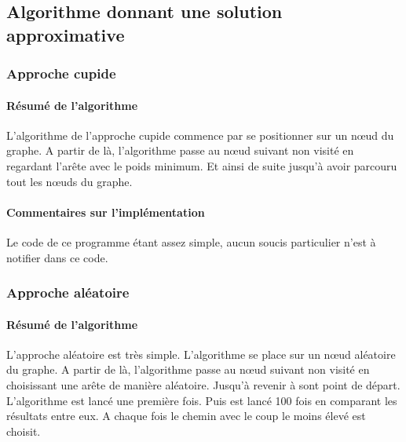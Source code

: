 \documentclass[10pt,a4paper]{report}
\begin{document}
		
	\subsection{Algorithme donnant une solution approximative}
	
		\subsubsection{Approche cupide}
		
		\paragraph{Résumé de l'algorithme\\}
		\begin{flushleft}
		L'algorithme de l'approche cupide commence par se positionner sur un nœud du graphe. A partir de là, l'algorithme passe au nœud suivant non visité en regardant l'arête avec le poids minimum. Et ainsi de suite jusqu'à avoir parcouru tout les nœuds du graphe.
		\end{flushleft}
		
		
		\paragraph{Commentaires sur l'implémentation\\}
		\begin{flushleft}
		Le code de ce programme étant assez simple, aucun soucis particulier n'est à notifier dans ce code.
		\end{flushleft}
		
		\subsubsection{Approche aléatoire}
		
		\paragraph{Résumé de l'algorithme\\}
		\begin{flushleft}
		L'approche aléatoire est très simple. L'algorithme se place sur un nœud aléatoire du graphe. A partir de là, l'algorithme passe au nœud suivant non visité en choisissant une arête de manière aléatoire. Jusqu'à revenir à sont point de départ.
		L'algorithme est lancé une première fois. Puis est lancé 100 fois en comparant les résultats entre eux. A chaque fois le chemin avec le coup le moins élevé est choisit.
		\end{flushleft}
		
\end{document}
